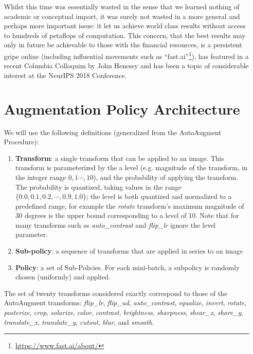 \documentclass[10pt,twocolumn,letterpaper]{article}
\begin{document}
    Whilst this time was essentially wasted in the sense that we learned nothing of academic or conceptual import, it was surely not wasted in a more general and perhaps more important issue: it let us achieve world class results without access to hundreds of petaflops of computation. This concern, that the best results may only in future be achievable to those with the financial resources, is a persistent gripe online (including influential movements such as ``fast.ai''\footnote{\url{https://www.fast.ai/about/}}), has featured in a recent Columbia Colloquim by John Henessy and has been a topic of considerable interest at the NeurIPS 2018 Conference. %

\section{Augmentation Policy Architecture}
  We will use the following definitions (generalized from the AutoAugment Procedure):

  \begin{enumerate}

    \item[] 
      \textbf{Transform}: a single transform that can be applied to an image. This transform is parameterized by the a level (e.g. magnitude of the transform, in the integer range $0,1 \cdots, 10$), and the probability of applying the transform. The probability is quantized, taking values in the range $\{0.0, 0.1, 0.2, \cdots, 0.9, 1.0\}$; the level is both quantized and normalized to a predefined range, for example the \textit{rotate} transform's maximum magnitude of $30$ degrees is the upper bound corresponding to a level of 10. Note that for many transforms such as \textit{auto\_contrast} and \textit{flip\_lr} ignore the level parameter.
    \item[] 
      \textbf{Sub-policy}: a sequence of transforms that are applied in series to an image
    \item[] 
      \textbf{Policy}: a set of Sub-Policies. For each mini-batch, a subpolicy is randomly chosen (uniformly) and applied.
  \end{enumerate}

  The set of twenty transforms considered exactly correspond to those of the AutoAugment transforms: \textit{flip\_lr}, \textit{flip\_ud}, \textit{auto\_contrast}, \textit{equalize}, \textit{invert}, \textit{rotate}, \textit{posterize}, \textit{crop}, \textit{solarize}, \textit{color}, \textit{contrast}, \textit{brightness}, \textit{sharpness}, \textit{shear\_x}, \textit{share\_y}, \textit{translate\_x}, \textit{translate\_y}, \textit{cutout}, \textit{blur}, and \textit{smooth}.
\end{document}
